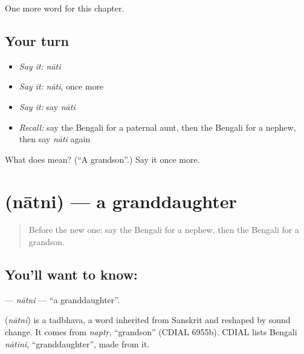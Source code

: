\begin{grammarlens}[title={What you've built}]
One more word for this chapter.
\end{grammarlens}

\subsection*{Your turn}
\begin{itemize}
\raggedright
  \item \emph{Say it:} \emph{nāti}
  \item \emph{Say it:} \emph{nāti}, once more
  \item \emph{Say it:} say \emph{nāti}
  \item \emph{Recall:} say the Bengali for a paternal aunt, then the Bengali for a nephew, then say \emph{nāti} again
\end{itemize}

\begin{tcolorbox}[breakable,colback=teal!4,colframe=teal!35!black,title={Before you move on}]
What does  mean? (\textquotedblleft{}A grandson\textquotedblright{}.) Say it once more.
\end{tcolorbox}
\section[\texorpdfstring{\bn{নাতনি} (nātni)}{নাতনি (nātni)}]{ (nātni) — a granddaughter}

\label{lesson:BN-C252-natni}



\begin{quote}
Before the new one: say the Bengali for a nephew, then the Bengali for a grandson.
\end{quote}

\subsection*{You'll want to know: }
\textbf{} — \emph{nātni} — \textquotedblleft{}a granddaughter\textquotedblright{}.

\begin{cousinweb}
\textbf{} (\emph{nātni}) is a tadbhava, a word inherited from Sanskrit and reshaped by sound change. It comes from \emph{naptṛ}, \textquotedblleft{}grandson\textquotedblright{} (CDIAL 6955b). CDIAL lists Bengali \emph{nātini}, \textquotedblleft{}granddaughter\textquotedblright{}, made from it.
\end{cousinweb}

